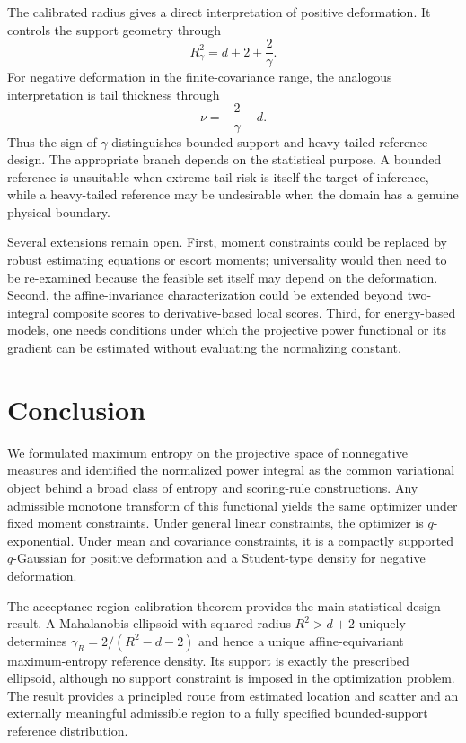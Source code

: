 \documentclass[pdflatex,sn-mathphys-num]{sn-jnl}
\theoremstyle{thmstyleone}
\theoremstyle{thmstyletwo}
\theoremstyle{thmstylethree}
\begin{document}
The calibrated radius gives a direct interpretation of positive deformation. It controls the support geometry through
\[
 R_\gamma^2=d+2+\frac{2}{\gamma}.
\]
For negative deformation in the finite-covariance range, the analogous interpretation is tail thickness through
\[
 \nu=-\frac{2}{\gamma}-d.
\]
Thus the sign of $\gamma$ distinguishes bounded-support and heavy-tailed reference design. The appropriate branch depends on the statistical purpose. A bounded reference is unsuitable when extreme-tail risk is itself the target of inference, while a heavy-tailed reference may be undesirable when the domain has a genuine physical boundary.

Several extensions remain open. First, moment constraints could be replaced by robust estimating equations or escort moments; universality would then need to be re-examined because the feasible set itself may depend on the deformation. Second, the affine-invariance characterization could be extended beyond two-integral composite scores to derivative-based local scores. Third, for energy-based models, one needs conditions under which the projective power functional or its gradient can be estimated without evaluating the normalizing constant.

\section{Conclusion}\label{sec:conclusion}

We formulated maximum entropy on the projective space of nonnegative measures and identified the normalized power integral as the common variational object behind a broad class of entropy and scoring-rule constructions. Any admissible monotone transform of this functional yields the same optimizer under fixed moment constraints. Under general linear constraints, the optimizer is $q$-exponential. Under mean and covariance constraints, it is a compactly supported $q$-Gaussian for positive deformation and a Student-type density for negative deformation.

The acceptance-region calibration theorem provides the main statistical design result. A Mahalanobis ellipsoid with squared radius $R^2>d+2$ uniquely determines $\gamma_R=2/(R^2-d-2)$ and hence a unique affine-equivariant maximum-entropy reference density. Its support is exactly the prescribed ellipsoid, although no support constraint is imposed in the optimization problem. The result provides a principled route from estimated location and scatter and an externally meaningful admissible region to a fully specified bounded-support reference distribution.
\end{document}
